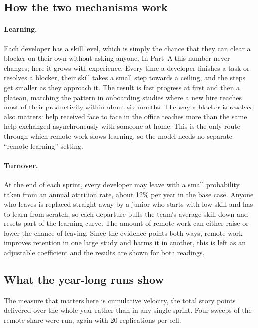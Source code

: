 \documentclass[11pt,a4paper]{article}
\begin{document}
\subsection*{How the two mechanisms work}

\paragraph{Learning.} Each developer has a skill level, which is simply the chance that they can
clear a blocker on their own without asking anyone. In Part~A this number never changes; here it
grows with experience. Every time a developer finishes a task or resolves a blocker, their skill
takes a small step towards a ceiling, and the steps get smaller as they approach it. The result is
fast progress at first and then a plateau, matching the pattern in onboarding studies where a new
hire reaches most of their productivity within about six months. The way a blocker is resolved
also matters: help received face to face in the office teaches more than the same help exchanged
asynchronously with someone at home. This is the only route through which remote work slows
learning, so the model needs no separate ``remote learning'' setting.

\paragraph{Turnover.} At the end of each sprint, every developer may leave with a small
probability taken from an annual attrition rate, about 12\% per year in the base case. Anyone who
leaves is replaced straight away by a junior who starts with low skill and has to learn from
scratch, so each departure pulls the team's average skill down and resets part of the learning
curve. The amount of remote work can either raise or lower the chance of leaving. Since the
evidence points both ways, remote work improves retention in one large study and harms it in
another, this is left as an adjustable coefficient and the results are shown for both readings.

\subsection*{What the year-long runs show}

The measure that matters here is cumulative velocity, the total story points delivered over the
whole year rather than in any single sprint. Four sweeps of the remote share were run, again with
20 replications per cell.
\end{document}
